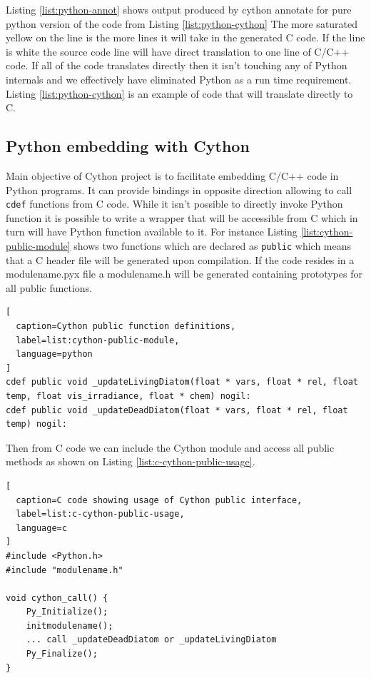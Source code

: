 \documentclass[12pt, a4paper]{report}
\begin{document}
Listing \ref{list:python-annot} shows output produced by cython annotate
for pure python version of the code from Listing \ref{list:python-cython}
The more saturated yellow on the line is the more lines it will take in
the generated C code. If the line is white the source code line will have
direct translation to one line of C/C++ code. If all of the code translates
directly then it isn't touching any of Python internals and we effectively
have eliminated Python as a run time requirement. Listing \ref{list:python-cython}
is an example of code that will translate directly to C.

\subsection{Python embedding with Cython}\label{sec:embed-cython}

Main objective of Cython project is to facilitate embedding C/C++ code in
Python programs. It can provide bindings in opposite direction allowing
to call \lstinline{cdef} functions from C code. While it isn't possible
to directly invoke Python function it is possible to write a wrapper
that will be accessible from C which in turn will have Python function
available to it. For instance Listing \ref{list:cython-public-module}
shows two functions which are declared as \lstinline{public} which means
that a C header file will be generated upon compilation. If the code
resides in a modulename.pyx file a modulename.h will be generated containing
prototypes for all public functions.

\begin{lstlisting}[
  caption=Cython public function definitions,
  label=list:cython-public-module,
  language=python
]
cdef public void _updateLivingDiatom(float * vars, float * rel, float temp, float vis_irradiance, float * chem) nogil:
cdef public void _updateDeadDiatom(float * vars, float * rel, float temp) nogil:
\end{lstlisting}

Then from C code we can include the Cython module and access all public methods as
shown on Listing \ref{list:c-cython-public-usage}.

\begin{lstlisting}[
  caption=C code showing usage of Cython public interface,
  label=list:c-cython-public-usage,
  language=c
]
#include <Python.h>
#include "modulename.h"

void cython_call() {
    Py_Initialize();
    initmodulename();
    ... call _updateDeadDiatom or _updateLivingDiatom
    Py_Finalize();
}\end{lstlisting}
\end{document}
